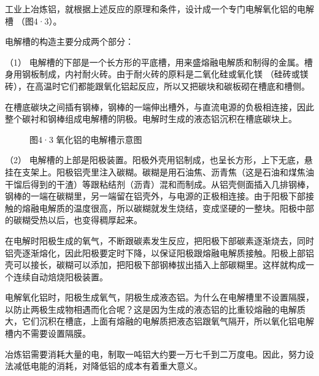 工业上冶炼铝，就根据上述反应的原理和条件，设计成一个专门电解氧化铝的电解槽
（图4·3）。

电解槽的构造主要分成两个部分：

（1）
电解槽的下部是一个长方形的平底槽，用来盛熔融电解质和制得的金属。槽身用钢板制成，内衬耐火砖。由于耐火砖的原料是二氧化硅或氧化镁
（硅砖或镁砖），在高温时它们都能跟氧化铝起反应，所以又把碳块和碳板砌在槽底和槽侧。

在槽底碳块之间插有钢棒，钢棒的一端伸出槽外，与直流电源的负极相连接，因此整个碳衬和钢棒组成电解槽的阴极。电解时生成的液态铝沉积在槽底碳块上。

\begin{figure}
\centering
\caption{图4·3 氧化铝的电解槽示意图}
\end{figure}

（2）
电解槽的上部是阳极装置。阳极外壳用铝制成，也呈长方形，上下无底，悬挂在支架上。阳极铝壳里注入碳糊。碳糊是用石油焦、沥青焦（这是石油和煤焦油干馏后得到的干渣）等跟粘结剂（沥青）混和而制成。从铝壳侧面插入几排钢棒，钢棒的一端在碳糊里，另一端留在铝壳外，与电源的正极相连接。由于阳极下部接触的熔融电解质的温度很高，所以碳糊就发生烧结，变成坚硬的一整块。阳极中部的碳糊受热以后，也变得稠厚起来。

在电解时阳极生成的氧气，不断跟碳素发生反应，把阳极下部碳素逐渐烧去，同时铝壳逐渐熔化，因此阳极要定时下降，以保证阳极跟熔融电解质接触。阳极上部铝壳可以接长，碳糊可以添加，把阳极下部钢棒拔出插入上部碳糊里。这样就构成一个连续自动焙烧阳极装置。

电解氧化铝时，阳极生成氧气，阴极生成液态铝。为什么在电解槽里不设置隔膜，以防止两极生成物相遇而化合呢？这是因为生成的液态铝的比重较熔融的电解质大，它们沉积在槽底，上面有熔融的电解质把液态铝跟氧气隔开，所以氧化铝电解槽内不需要设置隔膜。

冶炼铝需要消耗大量的电，制取一吨铝大约要一万七千到二万度电。因此，努力设法减低电能的消耗，对降低铝的成本有着重大意义。

